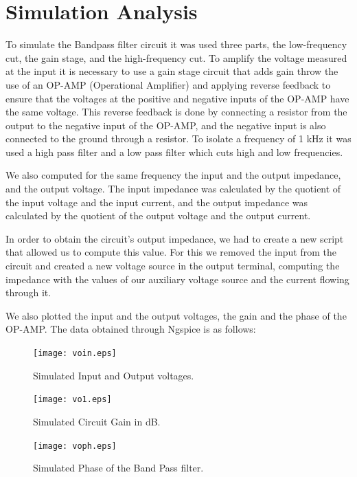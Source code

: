 \section{Simulation Analysis}
\label{sec:simulation}
To simulate the Bandpass filter circuit it was used three parts, the low-frequency cut, the gain stage, and the high-frequency cut.
To amplify the voltage measured at the input it is necessary to use a gain stage circuit that adds gain throw the use of an OP-AMP (Operational Amplifier) and applying reverse feedback to ensure that the voltages at the positive and negative inputs of the OP-AMP have the same voltage. This reverse feedback is done by connecting a resistor from the output to the negative input of the OP-AMP, and the negative input is also connected to the ground through a resistor.
To isolate a frequency of 1 kHz it was used a high pass filter and a low pass filter which cuts high and low frequencies.

We also computed for the same frequency the input and the output impedance, and the output voltage. The input impedance was calculated by the quotient of the input voltage and the input current, and the output impedance was calculated by the quotient of the output voltage and the output current.

In order to obtain the circuit's output impedance, we had to create a new script that allowed us to compute this value. For this we removed the input from the circuit and created a new voltage source in the output terminal, computing the impedance with the values of our auxiliary voltage source and the current flowing through it.

We also plotted the input and the output voltages, the gain and the phase of the OP-AMP.
The data obtained through Ngspice is as follows:

\begin{figure}[h] 
\centering
\texttt{[image: voin.eps]}
\caption{Simulated Input and Output voltages.}
\label{Fig3: InOutvoltage}
\end{figure}

\begin{figure}[h] 
\centering
\texttt{[image: vo1.eps]}
\caption{Simulated Circuit Gain in dB.}
\label{Fig4: GaindB}
\end{figure}

\begin{figure}[h] 
\centering
\texttt{[image: voph.eps]}
\caption{Simulated Phase of the Band Pass filter.}
\label{Fig5: Phase}
\end{figure}


